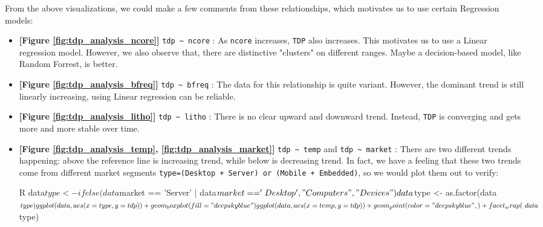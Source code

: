 From the above visualizations, we could make a few comments from these relationships, which motivates us to use certain Regression models:
\begin{itemize}
    \item \textbf{[Figure \ref{fig:tdp_analysis_ncore}]} \verb|tdp ~ ncore| : As \verb|ncore| increases, \verb|TDP| also increases. This motivates us to use 
    a Linear regression model. However, we also observe that, there are distinctive "clusters" on different ranges. Maybe a decision-based model, like Random Forrest,
    is better.
    
    \item \textbf{[Figure \ref{fig:tdp_analysis_bfreq}]} \verb|tdp ~ bfreq| : The data for this relationship is quite variant. However, the dominant trend is still linearly increasing,
    using Linear regression can be reliable.
    
    \item \textbf{[Figure \ref{fig:tdp_analysis_litho}]} \verb|tdp ~ litho| : There is no clear upward and downward trend. Instead, \verb|TDP| is converging and gets more and more stable over time. 
    
    \item \textbf{[Figure \ref{fig:tdp_analysis_temp}, \ref{fig:tdp_analysis_market}]} \verb|tdp ~ temp| and \verb|tdp ~ market| : There are two different trends happening: 
    above the reference line is increasing trend, while below is decreasing trend. In fact, we have a feeling that these two trends come from 
    different market segments \verb|type=(Desktop + Server) or (Mobile + Embedded)|, so we would plot them out to verify:

        \begin{code}{R}
data$type <- ifelse(data$market == 'Server' | data$market == 'Desktop', "Computers", "Devices")
data$type <- as.factor(data$type)

ggplot(data, aes(x = type, y = tdp)) +
geom_boxplot(fill="deepskyblue")
            
ggplot(data, aes(x = temp, y = tdp)) +
geom_point(color="deepskyblue", ) +
facet_wrap(~data$type)
        \end{code}


\end{itemize}
